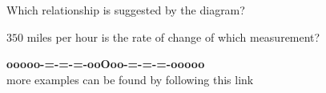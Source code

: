 \documentclass{ximera}
\begin{document}
\begin{question} 


Which relationship is suggested by the diagram?

\begin{multipleChoice}
\end{multipleChoice}

\end{question}






\begin{question} 


$350$ miles per hour is the rate of change of which measurement?

\begin{multipleChoice}
\end{multipleChoice}

\end{question}















\begin{center}
\textbf{\textcolor{green!50!black}{ooooo-=-=-=-ooOoo-=-=-=-ooooo}} \\

more examples can be found by following this link\\ 

\end{center}
\end{document}
